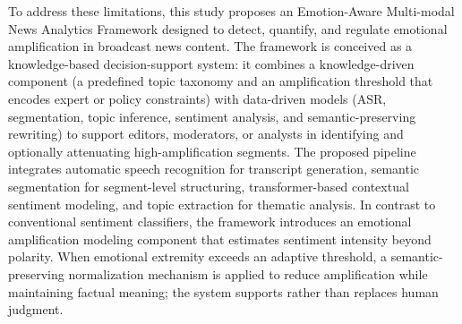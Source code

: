 \documentclass[final,1p,times]{elsarticle}
\begin{document}
To address these limitations, this study proposes an Emotion-Aware Multi-modal News Analytics Framework designed to detect, quantify, and regulate emotional amplification in broadcast news content. The framework is conceived as a knowledge-based decision-support system: it combines a knowledge-driven component (a predefined topic taxonomy and an amplification threshold that encodes expert or policy constraints) with data-driven models (ASR, segmentation, topic inference, sentiment analysis, and semantic-preserving rewriting) to support editors, moderators, or analysts in identifying and optionally attenuating high-amplification segments. The proposed pipeline integrates automatic speech recognition for transcript generation, semantic segmentation for segment-level structuring, transformer-based contextual sentiment modeling, and topic extraction for thematic analysis. In contrast to conventional sentiment classifiers, the framework introduces an emotional amplification modeling component that estimates sentiment intensity beyond polarity. When emotional extremity exceeds an adaptive threshold, a semantic-preserving normalization mechanism is applied to reduce amplification while maintaining factual meaning; the system supports rather than replaces human judgment.
\end{document}
